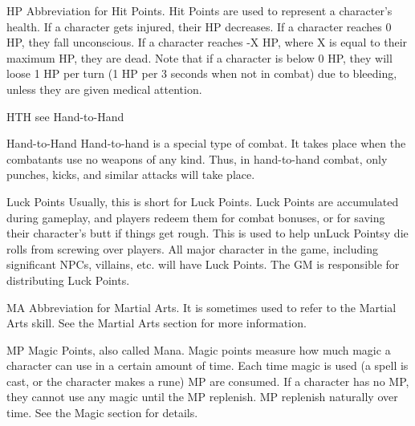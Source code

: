 \documentclass[twoside]{book}
\begin{document}
              
               HP   
                  Abbreviation for Hit Points. Hit Points are used
                 to represent a character's health. If a character
                 gets injured, their HP decreases. If a character reaches
                 0 HP, they fall unconscious. If a character reaches -X
                 HP, where X is equal to their maximum HP, they are dead.
                 Note that if a character is below 0 HP, they will loose
                 1 HP per turn (1 HP per 3 seconds when not in combat)
                 due to bleeding, unless they are given medical
                 attention. 
              
              
               HTH   
                see Hand-to-Hand   
              
              
               Hand-to-Hand   
                  Hand-to-hand is a special type of combat. It
                 takes place when the combatants use no weapons of any
                 kind. Thus, in hand-to-hand combat, only punches, kicks,
                 and similar attacks will take place. 
              
              
               Luck Points   
                  Usually, this is short for Luck Points. Luck
                 Points are accumulated during gameplay, and players
                 redeem them for combat bonuses, or for saving their
                 character's butt if things get rough. This is used
                 to help unLuck Pointsy die rolls from screwing over
                 players. All major character in the game, including
                 significant NPCs, villains, etc. will have Luck Points.
                 The GM is responsible for distributing Luck Points.
                 
              
              
               MA   
                  Abbreviation for Martial Arts. It is sometimes
                 used to refer to the Martial Arts skill. See the Martial
                 Arts section for more information. 
              
              
               MP   
                  Magic Points, also called Mana. Magic points
                 measure how much magic a character can use in a certain
                 amount of time. Each time magic is used (a spell is
                 cast, or the character makes a rune) MP are consumed. If
                 a character has no MP, they cannot use any magic until
                 the MP replenish. MP replenish naturally over time. See
                 the Magic section for details. 
              
\end{document}
